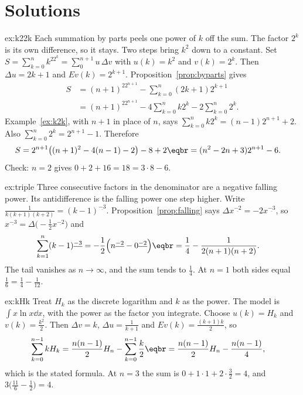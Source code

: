 \section{Solutions}

\begin{solution}{ex:k22k}
\idea Each summation by parts peels one power of $k$ off the sum. The factor $2^k$ is its own difference, so it stays. Two steps bring $k^2$ down to a constant.
\writeup Set $S=\sum_{k=0}^nk^22^k=\sum_0^{n+1}u\,\Delta v$ with $u(k)=k^2$ and $v(k)=2^k$. Then $\Delta u=2k+1$ and $Ev(k)=2^{k+1}$. Proposition~\ref{prop:byparts} gives
\[
\begin{aligned}S&=(n+1)^22^{n+1}-\sum_{k=0}^n(2k+1)2^{k+1}\\&=(n+1)^22^{n+1}-4\sum_{k=0}^nk2^k-2\sum_{k=0}^n2^k.\end{aligned}
\]
Example~\ref{ex:k2k}, with $n+1$ in place of $n$, says $\sum_{k=0}^nk2^k=(n-1)2^{n+1}+2$. Also $\sum_{k=0}^n2^k=2^{n+1}-1$. Therefore
\[
\begin{aligned}S&=2^{n+1}\bigl((n+1)^2-4(n-1)-2\bigr)-8+2\eqbr=(n^2-2n+3)2^{n+1}-6.\end{aligned}
\]
Check: $n=2$ gives $0+2+16=18=3\cdot8-6$.
\end{solution}

\begin{solution}{ex:triple}
\idea Three consecutive factors in the denominator are a negative falling power. Its antidifference is the falling power one step higher.
\writeup Write $\frac1{k(k+1)(k+2)}=(k-1)^{\underline{-3}}$. Proposition~\ref{prop:falling} says $\Delta x^{\underline{-2}}=-2x^{\underline{-3}}$, so $x^{\underline{-3}}=\Delta\bigl(-\frac12x^{\underline{-2}}\bigr)$ and
\[
\begin{aligned}\sum_{k=1}^n(k-1)^{\underline{-3}}&=-\frac12\Bigl(n^{\underline{-2}}-0^{\underline{-2}}\Bigr)\eqbr=\frac14-\frac1{2(n+1)(n+2)}.\end{aligned}
\]
The tail vanishes as $n\to\infty$, and the sum tends to $\frac14$. At $n=1$ both sides equal $\frac16=\frac14-\frac1{12}$.
\end{solution}

\begin{solution}{ex:kHk}
\idea Treat $H_k$ as the discrete logarithm and $k$ as the power. The model is $\int x\ln x\dd x$, with the power as the factor you integrate.
\writeup Choose $u(k)=H_k$ and $v(k)=\frac{k^{\underline2}}2$. Then $\Delta v=k$, $\Delta u=\frac1{k+1}$ and $Ev(k)=\frac{(k+1)k}2$, so
\[
\begin{aligned}\sum_{k=0}^{n-1}kH_k&=\frac{n(n-1)}2H_n-\sum_{k=0}^{n-1}\frac k2\eqbr=\frac{n(n-1)}2H_n-\frac{n(n-1)}4,\end{aligned}
\]
which is the stated formula. At $n=3$ the sum is $0+1\cdot1+2\cdot\frac32=4$, and $3\bigl(\frac{11}6-\frac12\bigr)=4$.
\end{solution}

